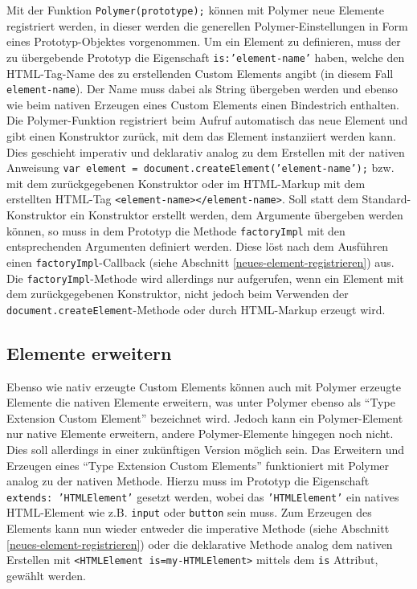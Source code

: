 Mit der Funktion \texttt{Polymer(pro\-to\-type);} können mit Polymer neue Elemente registriert werden, in dieser werden die generellen Polymer-Einstellungen in Form eines Prototyp-Objektes vorgenommen. Um ein Element zu definieren, muss der zu übergebende Prototyp die Eigenschaft \texttt{is:'element-name'} haben, welche den \ac{HTML}-Tag-Name des zu erstellenden Custom Elements angibt (in diesem Fall \texttt{element-name}). Der Name muss dabei als String übergeben werden und ebenso wie beim nativen Erzeugen eines Custom Elements einen Bindestrich enthalten. Die Polymer-Funktion registriert beim Aufruf automatisch das neue Element und gibt einen Konstruktor zurück, mit dem das Element instanziiert werden kann. Dies geschieht imperativ und deklarativ analog zu dem Erstellen mit der nativen Anweisung \texttt{var\ element\ =\ document.createElement('element-name');} bzw. mit dem zurückgegebenen Konstruktor oder im \ac{HTML}-Markup mit dem erstellten \ac{HTML}-Tag \texttt{\textless{}element-name\textgreater{}\textless{}/element-name\textgreater{}}. Soll statt dem Standard-Konstruktor ein Konstruktor erstellt werden, dem Argumente übergeben werden können, so muss in dem Prototyp die Methode \texttt{factoryImpl} mit den entsprechenden Argumenten definiert werden. Diese löst nach dem Ausführen einen \texttt{factoryImpl}-Callback (siehe Abschnitt \ref{neues-element-registrieren}) aus. Die \texttt{factoryImpl}-Methode wird allerdings nur aufgerufen, wenn ein Element mit dem zurückgegebenen Konstruktor, nicht jedoch beim Verwenden der \texttt{document.createElement}-Methode oder durch \ac{HTML}-Markup erzeugt wird.


\subsection{Elemente erweitern}\label{elemente-erweitern}

Ebenso wie nativ erzeugte Custom Elements können auch mit Polymer erzeugte Elemente die nativen Elemente erweitern, was unter Polymer ebenso als ``Type Extension Custom Element'' bezeichnet wird. Jedoch kann ein Polymer-Element nur native Elemente erweitern, andere Polymer-Elemente hingegen noch nicht. Dies soll allerdings in einer zukünftigen Version möglich sein. Das Erweitern und Erzeugen eines ``Type Extension Custom Elements'' funktioniert mit Polymer analog zu der nativen Methode. Hierzu muss im Prototyp die Eigenschaft \texttt{extends:\ '\ac{HTML}Element'} gesetzt werden, wobei das \texttt{'\ac{HTML}Element'} ein natives \ac{HTML}-Element wie z.B. \texttt{input} oder \texttt{button} sein muss. Zum Erzeugen des Elements kann nun wieder entweder die imperative Methode (siehe Abschnitt \ref{neues-element-registrieren}) oder die deklarative Methode analog dem nativen Erstellen mit \texttt{\textless{}\ac{HTML}Element\ is=\dq my-\ac{HTML}Element\dq\textgreater{}} mittels dem \texttt{is} Attribut, gewählt werden.


